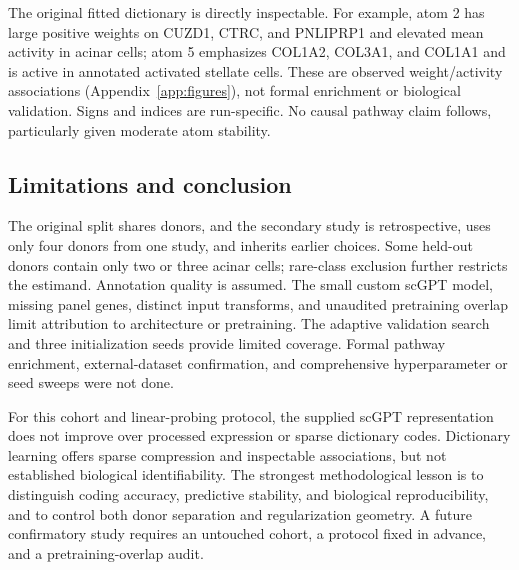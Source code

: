 The original fitted dictionary is directly inspectable. For example, atom 2
has large positive weights on CUZD1, CTRC, and PNLIPRP1 and elevated mean
activity in acinar cells; atom 5 emphasizes COL1A2, COL3A1, and COL1A1 and
is active in annotated activated stellate cells. These are observed
weight/activity associations (Appendix~\ref{app:figures}), not formal
enrichment or biological validation. Signs and indices are run-specific.
No causal pathway claim follows, particularly given moderate atom stability.

\subsection{Limitations and conclusion}
The original split shares donors, and the secondary study is retrospective,
uses only four donors from one study, and inherits earlier choices. Some
held-out donors contain only two or three acinar cells; rare-class exclusion
further restricts the estimand. Annotation quality is assumed. The small
custom scGPT model, missing panel genes, distinct input transforms, and
unaudited pretraining overlap limit attribution to architecture or
pretraining. The adaptive validation search and three initialization seeds
provide limited coverage. Formal pathway enrichment, external-dataset
confirmation, and comprehensive hyperparameter or seed sweeps were not done.

For this cohort and linear-probing protocol, the supplied scGPT representation
does not improve over processed expression or sparse dictionary codes.
Dictionary learning offers sparse compression and inspectable associations,
but not established biological identifiability. The strongest methodological
lesson is to distinguish coding accuracy, predictive stability, and
biological reproducibility, and to control both donor separation and
regularization geometry. A future confirmatory study requires an untouched
cohort, a protocol fixed in advance, and a pretraining-overlap audit.
\label{main-report-end}
\FloatBarrier
